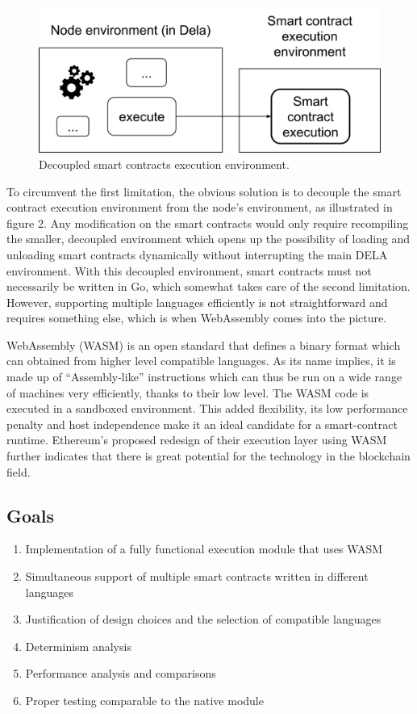 \documentclass[11pt, a4paper, twoside, openright]{article}
\begin{document}
\begin{figure}[htbp]
 \centering
  \includegraphics[width=12cm]{wasm2.png}
  \caption{Decoupled smart contracts execution environment.}
\end{figure}

To circumvent the first limitation, the obvious solution is to decouple the smart contract execution environment from the node's environment, as illustrated in figure 2. Any modification on the smart contracts would only require recompiling the smaller, decoupled environment which opens up the possibility of loading and unloading smart contracts dynamically without interrupting the main DELA environment. With this decoupled environment, smart contracts must not necessarily be written in Go, which somewhat takes care of the second limitation. However, supporting multiple languages efficiently is not straightforward and requires something else, which is when WebAssembly comes into the picture.

WebAssembly (WASM) is an open standard that defines a binary format which can obtained from higher level compatible languages. As its name implies, it is made up of ``Assembly-like'' instructions which can thus be run on a wide range of machines very efficiently, thanks to their low level. The WASM code is executed in a sandboxed environment. This added flexibility, its low performance penalty and host independence make it an ideal candidate for a smart-contract runtime. Ethereum's proposed redesign of their execution layer using WASM further indicates that there is great potential for the technology in the blockchain field. 

\subsection{Goals}
\label{Goals}

\begin{enumerate} 

\itemsep0em

 \item Implementation of a fully functional execution module that uses WASM
 \item Simultaneous support of multiple smart contracts written in different languages
 \item Justification of design choices and the selection of compatible languages
 \item Determinism analysis
 \item Performance analysis and comparisons
 \item Proper testing comparable to the native module

\end{enumerate}
\end{document}
